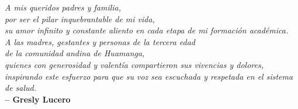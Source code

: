 \thispagestyle{empty}
\vspace*{5.0cm}

\begin{flushright}
    \begin{minipage}{0.65\textwidth}
        \textit{A mis queridos padres y familia,\\
        por ser el pilar inquebrantable de mi vida,\\
        su amor infinito y constante aliento en cada etapa de mi formación académica.}\\[0.8cm]
        \textit{A las madres, gestantes y personas de la tercera edad\\
        de la comunidad andina de Huamanga,\\
        quienes con generosidad y valentía compartieron sus vivencias y dolores,\\
        inspirando este esfuerzo para que su voz sea escuchada y respetada en el sistema de salud.}\\[1.0cm]
        \textbf{-- Gresly Lucero}
    \end{minipage}
\end{flushright}

\newpage
